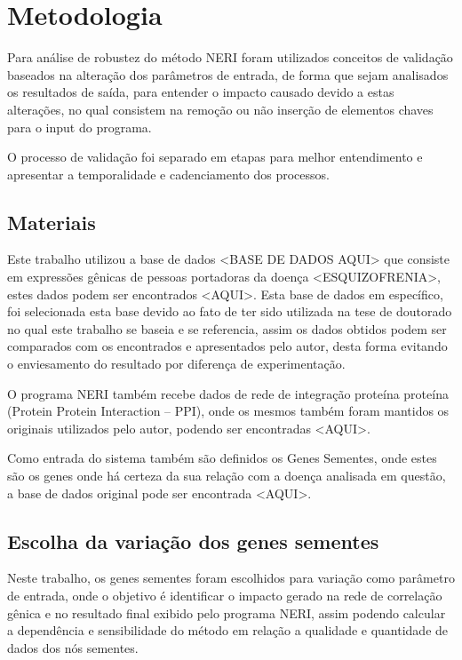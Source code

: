 \chapter[Metodologia]{Metodologia}

Para análise de robustez do método NERI foram utilizados conceitos de validação baseados na alteração dos parâmetros de entrada, de forma que sejam analisados os resultados de saída, para entender o impacto causado devido a estas alterações, no qual consistem na remoção ou não inserção de elementos chaves para o input do programa. 

O processo de validação foi separado em etapas para melhor entendimento e apresentar a temporalidade e cadenciamento dos processos.

\section{Materiais}

Este trabalho utilizou a base de dados <BASE DE DADOS AQUI> que consiste em expressões gênicas de pessoas portadoras da doença <ESQUIZOFRENIA>, estes dados podem ser encontrados <AQUI>. Esta base de dados em específico, foi selecionada esta base devido ao fato de ter sido utilizada na tese de doutorado no qual este trabalho se baseia e se referencia, assim os dados obtidos podem ser comparados com os encontrados e apresentados pelo autor, desta forma evitando o enviesamento do resultado por diferença de experimentação.

O programa NERI também recebe dados de rede de integração proteína proteína (Protein Protein Interaction – PPI), onde os mesmos também foram mantidos os originais utilizados pelo autor, podendo ser encontradas <AQUI>.

Como entrada do sistema também são definidos os Genes Sementes, onde estes são os genes onde há certeza da sua relação com a doença analisada em questão, a base de dados original pode ser encontrada <AQUI>. 


\section{Escolha da variação dos genes sementes}
Neste trabalho, os genes sementes foram escolhidos para variação como parâmetro de entrada, onde o objetivo é identificar o impacto gerado na rede de correlação gênica e no resultado final exibido pelo programa NERI, assim podendo calcular a dependência e sensibilidade do método em relação a qualidade e quantidade de dados dos nós sementes.


